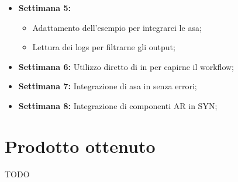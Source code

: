 \begin{itemize}
\begin{itemize}
        \end{itemize}
    \item \textbf{Settimana 5:} 
        \begin{itemize}
            \item Adattamento dell'esempio \arplug per integrarci le asa;
            \item Lettura dei logs per filtrarne gli output;
        \end{itemize}
    \item \textbf{Settimana 6:} Utilizzo diretto di \arcore in \flutter per capirne il workflow;
    \item \textbf{Settimana 7:} Integrazione di asa in \flutter senza errori;
    \item \textbf{Settimana 8:} Integrazione di componenti AR in SYN;
\end{itemize}
\section{Prodotto ottenuto}
TODO

